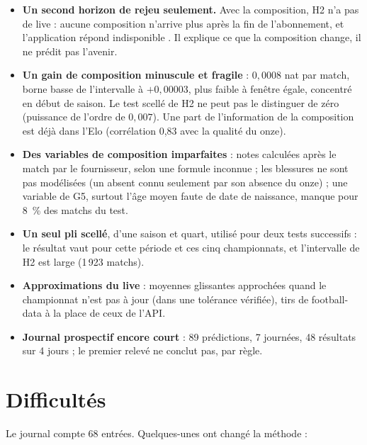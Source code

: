 \begin{itemize}
  \item \textbf{Un second horizon de rejeu seulement.} Avec la composition, H2 n'a pas de live : aucune
        composition n'arrive plus après la fin de l'abonnement, et l'application répond \og indisponible
        \fg{}. Il explique ce que la composition change, il ne prédit pas l'avenir.
  \item \textbf{Un gain de composition minuscule et fragile} : \(0{,}0008\) nat par match, borne basse de
        l'intervalle à \(+0{,}00003\), plus faible à fenêtre égale, concentré en début de saison. Le test
        scellé de H2 ne peut pas le distinguer de zéro (puissance de l'ordre de \(0{,}007\)). Une part de
        l'information de la composition est déjà dans l'Elo (corrélation 0,83 avec la qualité du onze).
  \item \textbf{Des variables de composition imparfaites} : notes calculées après le match par le
        fournisseur, selon une formule inconnue ; les blessures ne sont pas modélisées (un absent connu
        seulement par son absence du onze) ; une variable de G5, surtout l'âge moyen faute de date de
        naissance, manque pour 8~\% des matchs du test.
  \item \textbf{Un seul pli scellé}, d'une saison et quart, utilisé pour deux tests successifs : le résultat
        vaut pour cette période et ces cinq championnats, et l'intervalle de H2 est large (1\,923 matchs).
  \item \textbf{Approximations du live} : moyennes glissantes approchées quand le championnat n'est pas à
        jour (dans une tolérance vérifiée), tirs de football-data à la place de ceux de l'API.
  \item \textbf{Journal prospectif encore court} : 89 prédictions, 7 journées, 48 résultats sur 4 jours ;
        le premier relevé ne conclut pas, par règle.
\end{itemize}

\section{Difficultés}

Le journal compte 68 entrées. Quelques-unes ont changé la méthode :

